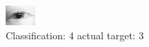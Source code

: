 \begin{figure}[h!]
\begin{center}
\includegraphics[width=0.60\columnwidth]{figures/ID8_class_4_target_3.png}
\end{center}
\caption{ Classification: 4 actual target: 3}
\label{fig:ID8_class_4_target_3}
\end{figure}
